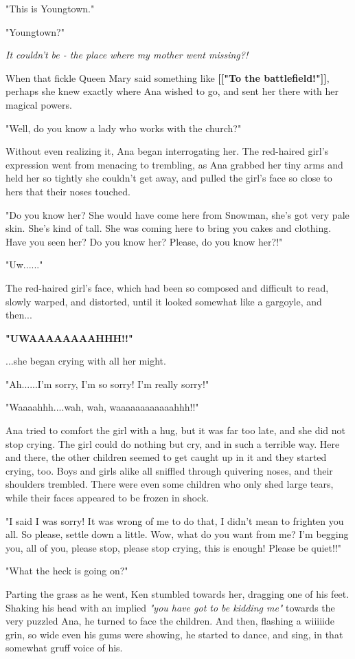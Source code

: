 \documentclass[
]{article}
\begin{document}
"This is Youngtown."

"Youngtown?"

\emph{It couldn't be - the place where my mother went missing?!}

When that fickle Queen Mary said something like \textbf{{[}{[}"To the
battlefield!"{]}{]}}, perhaps she knew exactly where Ana wished to go,
and sent her there with her magical powers.

"Well, do you know a lady who works with the church?"

Without even realizing it, Ana began interrogating her. The red-haired
girl's expression went from menacing to trembling, as Ana grabbed her
tiny arms and held her so tightly she couldn't get away, and pulled the
girl's face so close to hers that their noses touched.

"Do you know her? She would have come here from Snowman, she's got very
pale skin. She's kind of tall. She was coming here to bring you cakes
and clothing. Have you seen her? Do you know her? Please, do you know
her?!"

"Uw......"

The red-haired girl's face, which had been so composed and difficult to
read, slowly warped, and distorted, until it looked somewhat like a
gargoyle, and then...

\textbf{"UWAAAAAAAAHHH!!"}

...she began crying with all her might.

"Ah......I'm sorry, I'm so sorry! I'm really sorry!"

"Waaaahhh....wah, wah, waaaaaaaaaaaahhh!!"

Ana tried to comfort the girl with a hug, but it was far too late, and
she did not stop crying. The girl could do nothing but cry, and in such
a terrible way. Here and there, the other children seemed to get caught
up in it and they started crying, too. Boys and girls alike all sniffled
through quivering noses, and their shoulders trembled. There were even
some children who only shed large tears, while their faces appeared to
be frozen in shock.

"I said I was sorry! It was wrong of me to do that, I didn't mean to
frighten you all. So please, settle down a little. Wow, what do you want
from me? I'm begging you, all of you, please stop, please stop crying,
this is enough! Please be quiet!!"

"What the heck is going on?"

Parting the grass as he went, Ken stumbled towards her, dragging one of
his feet. Shaking his head with an implied \emph{"you have got to be
kidding me"} towards the very puzzled Ana, he turned to face the
children. And then, flashing a wiiiiide grin, so wide even his gums were
showing, he started to dance, and sing, in that somewhat gruff voice of
his.
\end{document}
